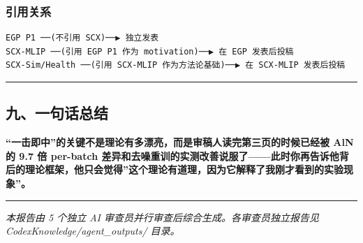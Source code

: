 \documentclass[
  12pt,
]{ctexart}
\begin{document}
\subsubsection{引用关系}\label{ux5f15ux7528ux5173ux7cfb}

\begin{verbatim}
EGP P1 ──(不引用 SCX)──▶ 独立发表
SCX-MLIP ──(引用 EGP P1 作为 motivation)──▶ 在 EGP 发表后投稿
SCX-Sim/Health ──(引用 SCX-MLIP 作为方法论基础)──▶ 在 SCX-MLIP 发表后投稿
\end{verbatim}

\begin{center}\rule{0.5\linewidth}{0.5pt}\end{center}

\subsection{九、一句话总结}\label{ux4e5dux4e00ux53e5ux8bddux603bux7ed3}

\textbf{``一击即中''的关键不是理论有多漂亮，而是审稿人读完第三页的时候已经被
AlN 的 9.7 倍 per-batch
差异和去噪重训的实测改善说服了------此时你再告诉他背后的理论框架，他只会觉得''这个理论有道理，因为它解释了我刚才看到的实验现象''。}

\begin{center}\rule{0.5\linewidth}{0.5pt}\end{center}

\emph{本报告由 5 个独立 AI 审查员并行审查后综合生成。各审查员独立报告见
CodexKnowledge/agent\_outputs/ 目录。}
\end{document}
